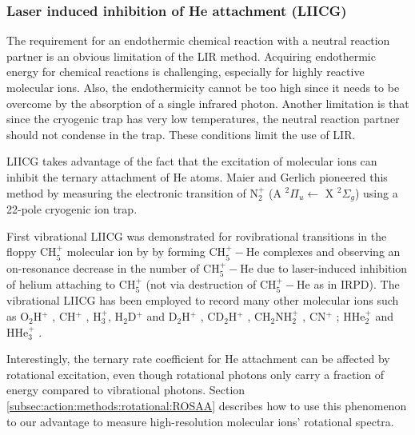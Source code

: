 \subsubsection{Laser induced inhibition of He attachment (LIICG)}
\label{subsec:action:methods:vibrational:LIICG}

The requirement for an endothermic chemical reaction with a neutral reaction partner is an obvious limitation of the LIR method. Acquiring endothermic energy for chemical reactions is challenging, especially for highly reactive molecular ions. Also, the endothermicity cannot be too high since it needs to be overcome by the absorption of a single infrared photon. Another limitation is that since the cryogenic trap has very low temperatures, the neutral reaction partner should not condense in the trap. These conditions limit the use of LIR.

LIICG takes advantage of the fact that the excitation of molecular ions can inhibit the ternary attachment of He atoms. Maier and Gerlich \cite{chakrabarty_novel_2013} pioneered this method by measuring the electronic transition of N$_2^+$ (A $ ^2\Pi_u \leftarrow$ X $^2\Sigma_g$) using a 22-pole cryogenic ion trap.

First vibrational LIICG was demonstrated for rovibrational transitions in the floppy CH$_5^+$ molecular ion by \citet{asvany_coltrap_2014} by forming CH$_5^+-$He complexes and observing an on-resonance decrease in the number of CH$_5^+-$He due to laser-induced inhibition of helium attaching to CH$_5^+$ (not via destruction of CH$_5^+-$He as in IRPD). The vibrational LIICG has been employed to record many other molecular ions such as O$_2$H$^+$ \cite{kohguchi_high-resolution_2018}, CH$^+$ \cite{domenech_first_2018}, H$_3^+$, H$_2$D$^+$ and D$_2$H$^+$ \cite{jusko_frequency_2016}, CD$_2$H$^+$ \cite{jusko_high-resolution_2017}, CH$_2$NH$_2^+$ \cite{Markus2019}, CN$^+$ \cite{domenech_high-resolution_2020}; HHe$_2^+$ and HHe$_3^+$ \cite{topfer_spectroscopic_2020}.

Interestingly, the ternary rate coefficient for He attachment can be affected by rotational excitation, even though rotational photons only carry a fraction of energy compared to vibrational photons. Section \ref{subsec:action:methods:rotational:ROSAA} describes how to use this phenomenon to our advantage to measure high-resolution molecular ions' rotational spectra.


